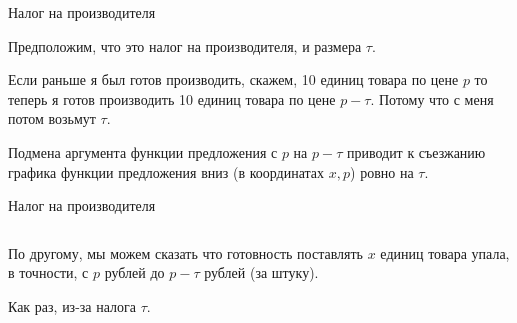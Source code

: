 \documentclass{beamer}
\begin{document}
\begin{frame}{Налог на производителя}

Предположим, что это налог на производителя, и размера $\tau$.

Если раньше я был готов производить, скажем, 10 единиц товара по цене $p$ то теперь я готов производить 10 единиц товара по цене $p-\tau$. Потому что с меня потом возьмут $\tau$.

Подмена аргумента функции предложения с $p$ на $p-\tau$ приводит к съезжанию графика функции предложения вниз (в координатах $x,p$) ровно на $\tau$.

\end{frame}

\begin{frame}{Налог на производителя}
\begin{columns}
\begin{column}{0.5\textwidth}
   По другому, мы можем сказать что готовность поставлять $x$ единиц товара упала, в точности, с $p$ рублей до $p-\tau$ рублей (за штуку). 
   
   \medskip
   
   Как раз, из-за налога $\tau$. 
   
   \medskip
   

\end{column}
\end{columns}
\end{frame}
\end{document}
